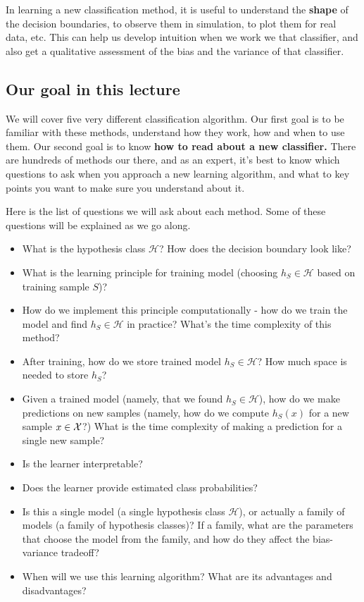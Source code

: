 \documentclass[11pt]{article}
\newcommand{\Hc}{\mathcal{H}}
\begin{document}
      In learning a new classification method, it is useful to understand the
      {\bf shape} of the decision boundaries, to observe them in simulation, to
	plot them for real data, etc. This can help us develop intuition when we
	work we that classifier, and also get a qualitative assessment of the
	bias and the variance of that classifier. 
      
	\subsection{Our goal in this lecture}

	We will cover five very different classification algorithm. Our first
	goal is to be familiar with these methods, understand how they work, how
	and when to use them. Our second goal is to know {\bf how to read about
	a new classifier.} There are hundreds of methods our there, and as an
	expert, it's best to know which questions to ask when you approach a new
	learning algorithm, and what to key points you want to make sure you
	understand about it.

	Here is the list of questions we will ask about each method. Some of
	these questions will be explained as we go along.

\begin{itemize}
  \item What is the hypothesis class $\Hc$? How does the decision boundary look
    like?
  \item What is the learning principle for training model (choosing $h_S\in\Hc$
    based on training sample $S$)?
  \item How do we implement this principle computationally - how do we train the
    model and find $h_S\in\Hc$ in practice? What's the time complexity of this method?
    \item After training, how do we store trained model $h_S\in\Hc$? How much space
    is needed to store $h_S$?
  \item Given a trained model (namely, that we found $h_S\in\Hc$), how do we make
    predictions on new samples (namely, how do we compute $h_S(x)$ for a new
    sample $x\in\mathcal{X}$?) What is the time complexity of making a
    prediction for a single new sample?
  \item Is the learner interpretable?
  \item Does the learner provide estimated class probabilities?
  \item Is this a single model (a single hypothesis class $\Hc$), or actually a
    family of models (a family of hypothesis classes)? If a family, what are the
    parameters that choose the model from the family, and how do they affect the
    bias-variance tradeoff?
    \item When will we use this learning algorithm? What are its advantages and
      disadvantages?
\end{itemize}
\end{document}
